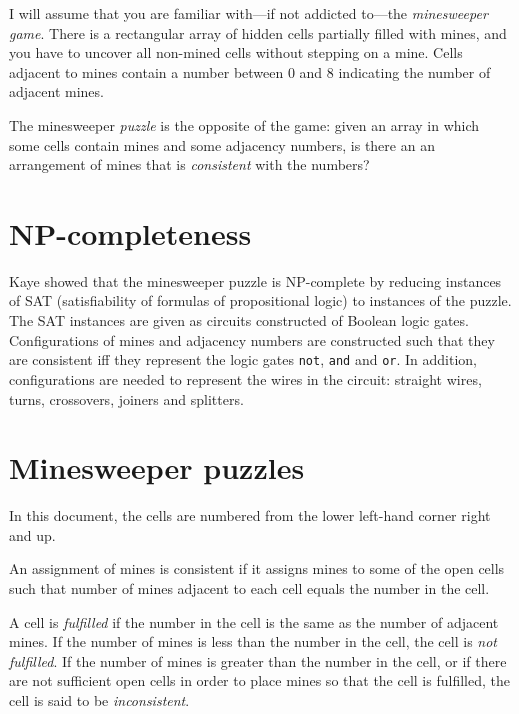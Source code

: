 \documentclass[11pt,a4paper]{article}
\begin{document}
I will assume that you are familiar with---if not addicted to---the \emph{minesweeper game}. There is a rectangular array of hidden cells partially filled with mines, and you have to uncover all non-mined cells without stepping on a mine. Cells adjacent to mines contain a number between 0 and 8 indicating the number of adjacent mines. 

The minesweeper \emph{puzzle} is the opposite of the game: given an array in which some cells contain mines and some adjacency numbers, is there an an arrangement of mines that is \emph{consistent} with the numbers?

\section{NP-completeness}

Kaye showed that the minesweeper puzzle is NP-complete by reducing instances of SAT (satisfiability of formulas of propositional logic) to instances of the puzzle. The SAT instances are given as circuits constructed of Boolean logic gates. Configurations of mines and adjacency numbers are constructed such that they are consistent iff they represent the logic gates \texttt{not}, \texttt{and} and \texttt{or}. In addition, configurations are needed to represent the wires in the circuit: straight wires, turns, crossovers, joiners and splitters. 

\section{Minesweeper puzzles}

In this document, the cells are numbered from the lower left-hand corner right and up.

An assignment of mines is consistent if it assigns mines to some of the open cells such that number of mines adjacent to each cell equals the number in the cell.

A cell is \emph{fulfilled} if the number in the cell is the same as the number of adjacent mines. If the number of mines is less than the number in the cell, the cell is \emph{not fulfilled}. If the number of mines is greater than the number in the cell, or if there are not sufficient open cells in order to place mines so that the cell is fulfilled, the cell is said to be \emph{inconsistent}.
\end{document}
